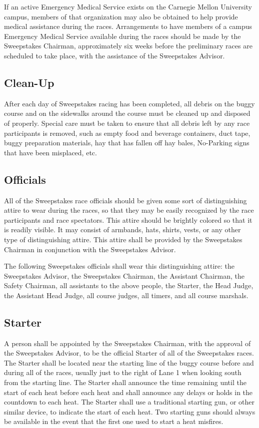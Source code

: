 	If an active Emergency Medical Service exists on the Carnegie Mellon University
	campus, members of that organization may also be obtained to help provide
	medical assistance during the races. Arrangements to have members of a campus
	Emergency Medical Service available during the races should be made by the
	Sweepstakes Chairman, approximately six weeks before the preliminary races are
	scheduled to take place, with the assistance of the Sweepstakes Advisor.

\subsection{Clean-Up}

	After each day of Sweepstakes racing has been completed, all debris on the
	buggy course and on the sidewalks around the course must be cleaned up and
	disposed of properly. Special care must be taken to ensure that all debris left
	by any race participants is removed, such as empty food and beverage
	containers, duct tape, buggy preparation materials, hay that has fallen off hay
	bales, No-Parking signs that have been misplaced, etc.

\subsection{Officials}

	All of the Sweepstakes race officials should be given some sort of
	distinguishing attire to wear during the races, so that they may be easily
	recognized by the race participants and race spectators. This attire should be
	brightly colored so that it is readily visible. It may consist of armbands,
	hats, shirts, vests, or any other type of distinguishing attire. This attire
	shall be provided by the Sweepstakes Chairman in conjunction with the
	Sweepstakes Advisor.

	The following Sweepstakes officials shall wear this distinguishing attire: the
	Sweepstakes Advisor, the Sweepstakes Chairman, the Assistant Chairman, the
	Safety Chairman, all assistants to the above people, the Starter, the Head
	Judge, the Assistant Head Judge, all course judges, all timers, and all course
	marshals.

\subsection{Starter}

	A person shall be appointed by the Sweepstakes Chairman, with the approval of
	the Sweepstakes Advisor, to be the official Starter of all of the Sweepstakes
	races. The Starter shall be located near the starting line of the buggy course
	before and during all of the races, usually just to the right of Lane 1 when
	looking south from the starting line. The Starter shall announce the time
	remaining until the start of each heat before each heat and shall announce any
	delays or holds in the countdown to each heat. The Starter shall use a
	traditional starting gun, or other similar device, to indicate the start of
	each heat. Two starting guns should always be available in the event that the
	first one used to start a heat misfires.

